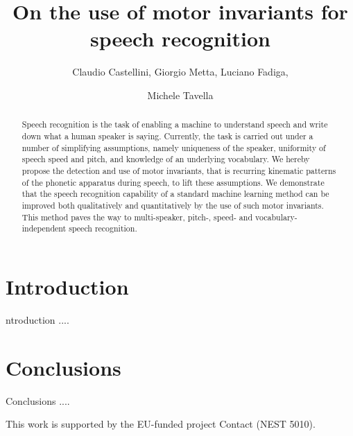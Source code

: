 \documentclass{pnastwo}
\begin{document}
\title{On the use of motor invariants for speech recognition}

\author{
Claudio Castellini,
Giorgio Metta,
Luciano Fadiga, \and
Michele Tavella
}


\maketitle

\begin{article}

\begin{abstract}
Speech recognition is the task of enabling a machine to understand speech and write down what a human speaker is saying. Currently, the task is carried out under a number of simplifying assumptions, namely uniqueness of the speaker, uniformity of speech speed and pitch, and knowledge of an underlying vocabulary. We hereby propose the detection and use of motor invariants, that is recurring kinematic patterns of the phonetic apparatus during speech, to lift these assumptions. We demonstrate that the speech recognition capability of a standard machine learning method can be improved both qualitatively and quantitatively by the use of such motor invariants. This method paves the way to multi-speaker, pitch-, speed- and vocabulary-independent speech recognition.
\end{abstract}


\section{Introduction}

ntroduction ....

\section{Conclusions}

Conclusions ....


\begin{acknowledgments}
This work is supported by the EU-funded project Contact (NEST 5010).
\end{acknowledgments}

%

\end{article}
\end{document}
